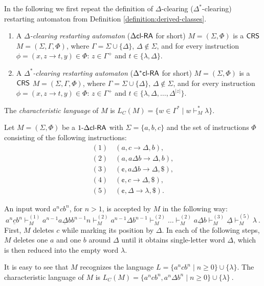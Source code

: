 \begin{definition}[\cite{CM10}]
In the following we first repeat the definition of $\Delta$-clearing ($\Delta^*$-clearing) restarting automaton from Definition \ref{definition:derived-classes}.
\begin{enumerate}
\item\label{definition:dxclra_dclra} A \emph{$\Delta$-clearing restarting automaton}  (\emph{$\DclRA$} for short) $M = (\Sigma, \Phi)$ is a $\CRS$ $M = (\Sigma, \Gamma, \Phi)$, where $\Gamma = \Sigma \cup \{\Delta\}$, $\Delta \notin \Sigma$, and for every instruction $\phi = (x, z \to t, y) \in \Phi$: $z \in \Gamma^+$ and $t \in \{\lambda, \Delta\}$.
\item\label{definition:dxclra_dxclra} A \emph{$\Delta^*$-clearing restarting automaton} (\emph{$\DXclRA$} for short) $M = (\Sigma, \Phi)$ is a $\CRS$ $M = (\Sigma, \Gamma, \Phi)$, where $\Gamma = \Sigma \cup \{\Delta\}$, $\Delta \notin \Sigma$, and for every instruction $\phi = (x, z \to t, y) \in \Phi$: $z \in \Gamma^+$ and $t \in \{\lambda, \Delta, \ldots, \Delta^{|z|}\}$.
\end{enumerate}
The \emph{characteristic language} of $M$ is $L_C(M) = \{ w \in \Gamma^* \mid w \vdash_M^* \lambda \}$.
\end{definition}

\begin{example}\label{example:dxclra_a^n_c_b^n}
Let $M = (\Sigma, \Phi)$ be a $\kDclRA[1]$ with $\Sigma = \{a, b, c\}$ and the set of instructions $\Phi$ consisting of the following instructions:
$$
\begin{array}{l}
(1) \quad (a, c \to \Delta, b),\\
(2) \quad (a, a\Delta b \to \Delta, b),\\
(3) \quad (\cent, a \Delta b \to \Delta, \$),\\
(4) \quad (\cent, c \to \Delta, \$),\\
(5) \quad (\cent, \Delta \to \lambda, \$).
\end{array}
$$

An input word $a^n c b^n$, for $n > 1$, is accepted by $M$ in the following way:
$$
a^n\underline{c}b^n \vdash_M^{(1)} a^{n-1}\underline{a \Delta b} b^{n-1}n
\vdash_M^{(2)} a^{n-1} \Delta b^{n-1} \vdash_M^{(2)} \ldots
\vdash_M^{(2)} \underline{a \Delta b}
\vdash_M^{(3)} \underline{\Delta}
\vdash_M^{(5)} \lambda\ .
$$
First, $M$ deletes $c$ while marking its position by $\Delta$. In each of the following steps, $M$ deletes one $a$ and one $b$ around $\Delta$ until it obtains single-letter word $\Delta$, which is then reduced into the empty word $\lambda$.

It is easy to see that $M$ recognizes the language $L = \{a^ncb^n \mid n\ge 0\} \cup \{\lambda\}$. The characteristic language of $M$ is $L_C(M) = \{a^ncb^n,a^n \Delta b^n \mid n \ge 0 \} \cup\{\lambda\}\ $.
\end{example}

